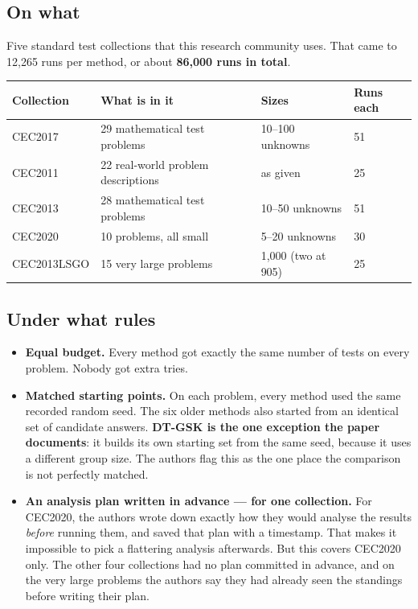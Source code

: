 \documentclass[11pt,a4paper]{article}
\newcommand{\hl}[1]{\textbf{#1}}
\begin{document}
\subsection{On what}

Five standard test collections that this research community uses. That came to
12{,}265 runs per method, or about \hl{86{,}000 runs in total}.

\begin{center}
\small
\begin{tabular}{@{}llll@{}}
\toprule
\textbf{Collection} & \textbf{What is in it} & \textbf{Sizes} & \textbf{Runs each} \\
\midrule
CEC2017 & 29 mathematical test problems & 10--100 unknowns & 51 \\
CEC2011 & 22 real-world problem descriptions & as given & 25 \\
CEC2013 & 28 mathematical test problems & 10--50 unknowns & 51 \\
CEC2020 & 10 problems, all small & 5--20 unknowns & 30 \\
CEC2013LSGO & 15 very large problems & 1{,}000 (two at 905) & 25 \\
\bottomrule
\end{tabular}
\end{center}

\subsection{Under what rules}

\begin{itemize}[leftmargin=1.2em, itemsep=2pt, topsep=3pt]
\item \hl{Equal budget.} Every method got exactly the same number of tests on
      every problem. Nobody got extra tries.
\item \hl{Matched starting points.} On each problem, every method used the same
      recorded random seed. The six older methods also started from an identical
      set of candidate answers. \hl{DT-GSK is the one exception the paper
      documents}: it builds its own starting set from the same seed, because it
      uses a different group size. The authors flag this as the one place the
      comparison is not perfectly matched.
\item \hl{An analysis plan written in advance --- for one collection.} For
      CEC2020, the authors wrote down exactly how they would analyse the results
      \emph{before} running them, and saved that plan with a timestamp. That
      makes it impossible to pick a flattering analysis afterwards. But this
      covers CEC2020 only. The other four collections had no plan committed in
      advance, and on the very large problems the authors say they had already
      seen the standings before writing their plan.
\end{itemize}
\end{document}
